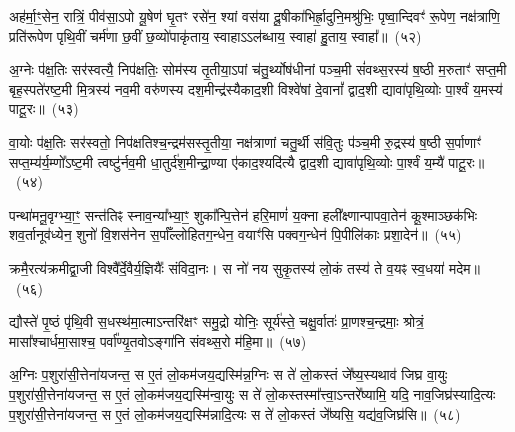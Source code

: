 अह॑र्मा॒ꣳ॒सेन॒ रात्रिं॒ पीव॑सा॒\-ऽपो यू॒षेण॑ घृ॒तꣳ रसे॑न॒ श्यां वस॑या दू॒षीका॑भिर्\mbox{}ह्रा॒दुनि॒मश्रु॑भिः॒ पृष्वा॒न्दिवꣳ॑ रू॒पेण॒ नक्ष॑त्राणि॒ प्रति॑रूपेण पृथि॒वीं चर्म॑णा छ॒वीं छ॒व्यो॑पाकृ॑ताय॒ स्वाहा\-ऽऽल॑ब्धाय॒ स्वाहा॑ हु॒ताय॒ स्वाहा᳚॥~(५२)\ip

{\anuvakamend[{अह॑र॒ष्टाविꣳ॑शतिः}]}%

अ॒ग्नेः प॑क्ष॒तिः सर॑स्वत्यै॒ निप॑क्षतिः॒ सोम॑स्य तृ॒तीया॒\-ऽपां च॑तु॒र्थ्योष॑धीनां पञ्च॒मी सं॑वथ्स॒रस्य॑ ष॒ष्ठी म॒रुताꣳ॑ सप्त॒मी बृह॒स्पते॑रष्ट॒मी मि॒त्रस्य॑ नव॒मी वरु॑णस्य दश॒मीन्द्र॑स्यैकाद॒शी विश्वे॑षां दे॒वानां᳚ द्वाद॒शी द्यावा॑पृथि॒व्योः पा॒र्श्वं य॒मस्य॑ पाटू॒रः॥~(५३)\ip

{\anuvakamend[{अ॒ग्नेरेका॒न्नत्रि॒ꣳ॒शत्}]}%

वा॒योः प॑क्ष॒तिः सर॑स्वतो॒ निप॑क्षतिश्च॒न्द्रम॑सस्तृ॒तीया॒ नक्ष॑त्राणां चतु॒र्थी स॑वि॒तुः प॑ञ्च॒मी रु॒द्रस्य॑ ष॒ष्ठी स॒र्पाणाꣳ॑ सप्त॒म्य॑र्य॒म्णो᳚\-ऽष्ट॒मी त्वष्टु॑र्नव॒मी धा॒तुर्द॑श॒मीन्द्रा॒ण्या ए॑काद॒श्यदि॑त्यै द्वाद॒शी द्यावा॑पृथि॒व्योः पा॒र्श्वं य॒म्यै॑ पाटू॒रः॥~(५४)\ip

{\anuvakamend[{वा॒योर॒ष्टाविꣳ॑शतिः}]}%

पन्था॑मनू॒वृग्भ्या॒ꣳ॒ सन्त॑तिꣴ स्नाव॒न्या᳚भ्या॒ꣳ॒ शुका᳚न्पि॒त्तेन॑ हरि॒माणं॑ य॒क्ना हली᳚क्ष्णान्पापवा॒तेन॑ कू॒श्माञ्छक॑भिः शव॒र्तानूव॑ध्येन॒ शुनो॑ वि॒शस॑नेन स॒र्पाँल्लोहितग॒न्धेन॒ वयाꣳ॑सि पक्वग॒न्धेन॑ पि॒पीलि॑काः प्रशा॒देन॑॥~(५५)\ip

{\anuvakamend[{पन्था॒न्द्वाविꣳ॑शतिः}]}%

क्रमै॒रत्य॑क्रमीद्वा॒जी विश्वै᳚र्दे॒वैर्य॒ज्ञियैः᳚ संविदा॒नः। स नो॑ नय सुकृ॒तस्य॑ लो॒कं तस्य॑ ते व॒यꣴ स्व॒धया॑ मदेम॥~(५६)\ip

{\anuvakamend[{क्रमै॑र॒ष्टाद॑श}]}%

द्यौस्ते॑ पृ॒ष्ठं पृ॑थि॒वी स॒धस्थ॑मा॒त्माऽन्तरि॑क्षꣳ समु॒द्रो योनिः॒ सूर्य॑स्ते॒ चक्षु॒र्वातः॑ प्रा॒णश्च॒न्द्रमाः॒ श्रोत्रं॒ मासा᳚श्चार्धमा॒साश्च॒ पर्वा᳚ण्यृ॒तवो\-ऽङ्गा॑नि संवथ्स॒रो म॑हि॒मा॥~(५७)\ip

{\anuvakamend[{द्यौः पञ्च॑विꣳशतिः}]}%

अ॒ग्निः प॒शुरा॑सी॒त्तेना॑यजन्त॒ स ए॒तं लो॒कम॑जय॒द्यस्मि॑न्न॒ग्निः स ते॑ लो॒कस्तं जे᳚ष्य॒स्यथाव॑ जिघ्र वा॒युः प॒शुरा॑सी॒त्तेना॑यजन्त॒ स ए॒तं लो॒कम॑जय॒द्यस्मि॑न्वा॒युः स ते॑ लो॒कस्तस्मा᳚त्त्वा॒\-ऽन्तरे᳚ष्यामि॒ यदि॒ नाव॒जिघ्र॑स्यादि॒त्यः प॒शुरा॑सी॒त्तेना॑यजन्त॒ स ए॒तं लो॒कम॑जय॒द्यस्मि॑न्नादि॒त्यः स ते॑ लो॒कस्तं जे᳚ष्यसि॒ यद्य॑व॒जिघ्र॑सि॥~(५८)\ip

{\anuvakamend[{यस्मि॑न्न॒ष्टौ च॑}]}%

